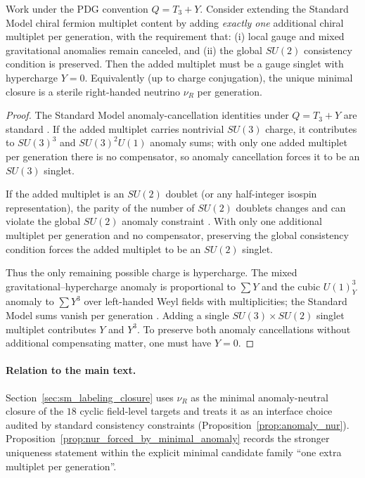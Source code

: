 \begin{proposition}
\label{prop:nur_forced_by_minimal_anomaly}
Work under the PDG convention $Q=T_3+Y$.
Consider extending the Standard Model chiral fermion multiplet content by adding \emph{exactly one} additional chiral multiplet per generation, with the requirement that:
(i) local gauge and mixed gravitational anomalies remain canceled, and
(ii) the global $SU(2)$ consistency condition is preserved.
Then the added multiplet must be a gauge singlet with hypercharge $Y=0$.
Equivalently (up to charge conjugation), the unique minimal closure is a sterile right-handed neutrino $\nu_R$ per generation.
\end{proposition}
\begin{proof}
The Standard Model anomaly-cancellation identities under $Q=T_3+Y$ are standard \cite{BouchiatIliopoulosMeyer1972,PeskinSchroeder1995,PDGRPP2024}.
If the added multiplet carries nontrivial $SU(3)$ charge, it contributes to $SU(3)^3$ and $SU(3)^2U(1)$ anomaly sums; with only one added multiplet per generation there is no compensator, so anomaly cancellation forces it to be an $SU(3)$ singlet.

If the added multiplet is an $SU(2)$ doublet (or any half-integer isospin representation), the parity of the number of $SU(2)$ doublets changes and can violate the global $SU(2)$ anomaly constraint \cite{Witten1982SU2Anomaly}.
With only one additional multiplet per generation and no compensator, preserving the global consistency condition forces the added multiplet to be an $SU(2)$ singlet.

Thus the only remaining possible charge is hypercharge.
The mixed gravitational--hypercharge anomaly is proportional to $\sum Y$ and the cubic $U(1)_Y^3$ anomaly to $\sum Y^3$ over left-handed Weyl fields with multiplicities; the Standard Model sums vanish per generation \cite{BouchiatIliopoulosMeyer1972,PeskinSchroeder1995}.
Adding a single $SU(3)\times SU(2)$ singlet multiplet contributes $Y$ and $Y^3$.
To preserve both anomaly cancellations without additional compensating matter, one must have $Y=0$.
\end{proof}

\paragraph{Relation to the main text.}
Section~\ref{sec:sm_labeling_closure} uses $\nu_R$ as the minimal anomaly-neutral closure of the $18$ cyclic field-level targets and treats it as an interface choice audited by standard consistency constraints (Proposition~\ref{prop:anomaly_nur}).
Proposition~\ref{prop:nur_forced_by_minimal_anomaly} records the stronger uniqueness statement within the explicit minimal candidate family ``one extra multiplet per generation''.

